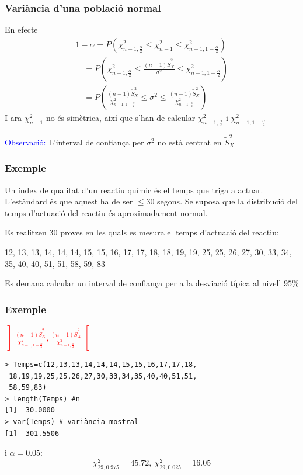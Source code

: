 \documentclass[12pt,t]{beamer}
\newcommand{\red}[1]{\textcolor{red}{#1}}
\newcommand{\blue}[1]{\textcolor{blue}{#1}}
\renewcommand{\leq}{\leqslant}
\theoremstyle{plain}
\theoremstyle{definition}
\begin{document}
\begin{frame}
\frametitle{Variància d'una població normal}

En efecte
$$
\begin{array}{l}
1-\alpha=P\left(\chi_{n-1,\frac{\alpha}{2}}^2\leq \chi_{n-1}^2\leq
\chi_{n-1,1-\frac{\alpha}{2}}^2\right)\\[2ex]
\quad\displaystyle =P\left(\chi_{n-1,\frac{\alpha}{2}}^2\leq \frac{(n-1) \widetilde{S}_{X}^2}{\sigma^2}\leq
\chi_{n-1,1-\frac{\alpha}{2}}^2
\right)\\[2ex]
\quad\displaystyle = P\left(\frac{(n-1)
\widetilde{S}_{X}^2}{\chi_{n-1,1-\frac{\alpha}{2}}^2}\leq\sigma^2\leq\frac{
(n-1)\widetilde{S}_{X}^2}{\chi_{n-1,\frac{\alpha}{2}}^2}
\right)
\end{array}
$$
I ara $\chi_{n-1}^2$ no és simètrica, així que s'han de calcular $\chi_{n-1,\frac{\alpha}{2}}^2$ i $\chi_{n-1,1-\frac{\alpha}{2}}^2$
\medskip

\blue{Observació:} L'interval de confiança per $\sigma^2$ no està
centrat en $\widetilde{S}_{X}^2$

\end{frame}


\begin{frame}
\frametitle{Exemple}

Un índex de qualitat d'un reactiu químic és el temps que triga a
actuar. L'estàndard és que aquest ha de ser $\leq 30$ segons.
Se suposa que la distribució del temps d'actuació del reactiu és
aproximadament normal. 
\medskip


Es realitzen 30 proves en les quals es mesura el temps
d'actuació del reactiu:
\medskip

12, 13, 13, 14, 14, 14, 15, 15, 16, 17, 17, 18, 18, 19, 19, 25, 25, 26, 27, 30,
33, 34, 35, 40, 40, 51, 51, 58, 59, 83
\medskip

Es demana calcular un interval de confiança per a la desviació típica al nivell
$95\%$
\end{frame}

\begin{frame}[fragile]
\frametitle{Exemple}
\red{$\displaystyle \left] \frac{(n-1)\widetilde{S}_{X}^2}{\chi_{n-1,1-\frac{\alpha}{2}}^2},
\frac{(n-1)\widetilde{S}_{X}^2}{\chi_{n-1,\frac{\alpha}{2}}^2}
\right[$}

\begin{verbatim}
> Temps=c(12,13,13,14,14,14,15,15,16,17,17,18,
 18,19,19,25,25,26,27,30,33,34,35,40,40,51,51,
 58,59,83)
> length(Temps) #n
[1]  30.0000
> var(Temps) # variància mostral
[1]  301.5506
\end{verbatim}
i  $\alpha=0.05$:
$$
\chi_{29,0.975}^2=45.72,\
\chi_{29,0.025}^2=16.05
$$
\end{frame}
\end{document}
